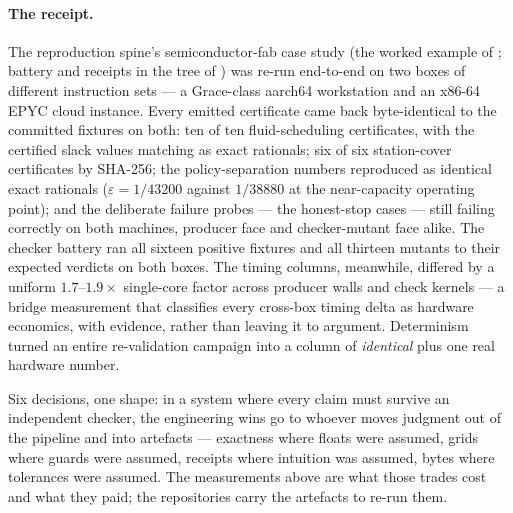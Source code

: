 \paragraph{The receipt.} The reproduction spine's semiconductor-fab
case study (the worked example of ; battery and receipts in the 
tree of ) was re-run
end-to-end on two boxes of different instruction sets --- a
Grace-class aarch64 workstation and an x86-64 EPYC cloud instance.
Every emitted certificate came back byte-identical to the committed
fixtures on both: ten of ten fluid-scheduling certificates, with the
certified slack values matching as exact rationals; six of six
station-cover certificates by SHA-256; the policy-separation numbers
reproduced as identical exact rationals ($\varepsilon = 1/43200$
against $1/38880$ at the near-capacity operating point); and the
deliberate failure probes --- the honest-stop cases --- still failing
correctly on both machines, producer face and checker-mutant face
alike. The checker battery ran all sixteen positive fixtures and all
thirteen mutants to their expected verdicts on both boxes. The timing
columns, meanwhile, differed by a uniform $1.7$--$1.9\times$
single-core factor across producer walls and check kernels --- a
bridge measurement that classifies every cross-box timing delta as
hardware economics, with evidence, rather than leaving it to argument.
Determinism turned an entire re-validation campaign into a column of
\emph{identical} plus one real hardware number.

\bigskip

\noindent Six decisions, one shape: in a system where every claim must
survive an independent checker, the engineering wins go to whoever
moves judgment out of the pipeline and into artefacts --- exactness
where floats were assumed, grids where guards were assumed, receipts
where intuition was assumed, bytes where tolerances were assumed. The
measurements above are what those trades cost and what they paid; the
repositories carry the artefacts to re-run them.
